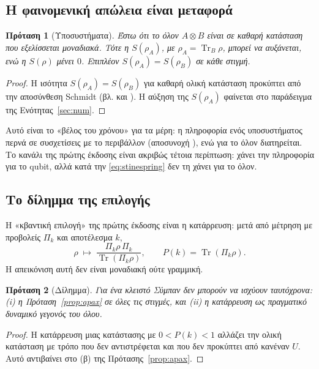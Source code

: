 \documentclass[a4paper,11pt]{article}
\newtheorem{prop}{Πρόταση}
\theoremstyle{definition}
\newcommand{\Tr}{\operatorname{Tr}}
\begin{document}
\subsection{Η φαινομενική απώλεια είναι μεταφορά}

\begin{prop}[Υποσυστήματα]\label{prop:sub}
Έστω ότι το όλον $A\otimes B$ είναι σε καθαρή κατάσταση που εξελίσσεται μοναδιακά. Τότε η $S(\rho_A)$, με $\rho_A=\Tr_B\rho$, μπορεί να αυξάνεται, ενώ η $S(\rho)$ μένει $0$. Επιπλέον $S(\rho_A)=S(\rho_B)$ σε κάθε στιγμή.
\end{prop}
\begin{proof}
Η ισότητα $S(\rho_A)=S(\rho_B)$ για καθαρή ολική κατάσταση προκύπτει από την αποσύνθεση Schmidt (βλ. και \cite{arakilieb}). Η αύξηση της $S(\rho_A)$ φαίνεται στο παράδειγμα της Ενότητας~\ref{sec:num}.
\end{proof}

Αυτό είναι το «βέλος του χρόνου» για τα μέρη: η πληροφορία ενός υποσυστήματος περνά σε συσχετίσεις με το περιβάλλον (αποσυνοχή \cite{zurek}), ενώ για το όλον διατηρείται. Το κανάλι της πρώτης έκδοσης είναι ακριβώς τέτοια περίπτωση: χάνει την πληροφορία για το qubit, αλλά κατά την \eqref{eq:stinespring} δεν τη χάνει για το όλον.

\subsection{Το δίλημμα της επιλογής}\label{sec:choice}

Η «κβαντική επιλογή» της πρώτης έκδοσης είναι η κατάρρευση: μετά από μέτρηση με προβολείς $\Pi_k$ και αποτέλεσμα $k$,
\begin{equation}
\rho\;\mapsto\;\frac{\Pi_k\rho\,\Pi_k}{\Tr(\Pi_k\rho)},\qquad P(k)=\Tr(\Pi_k\rho).
\end{equation}
Η απεικόνιση αυτή δεν είναι μοναδιακή ούτε γραμμική.

\begin{prop}[Δίλημμα]\label{prop:dilemma}
Για ένα κλειστό Σύμπαν δεν μπορούν να ισχύουν ταυτόχρονα: (i) η Πρόταση~\ref{prop:apax} σε όλες τις στιγμές, και (ii) η κατάρρευση ως πραγματικό δυναμικό γεγονός του όλου.
\end{prop}
\begin{proof}
Η κατάρρευση μιας κατάστασης με $0<P(k)<1$ αλλάζει την ολική κατάσταση με τρόπο που δεν αντιστρέφεται και που δεν προκύπτει από κανέναν $U$. Αυτό αντιβαίνει στο (β) της Πρότασης~\ref{prop:apax}.
\end{proof}
\end{document}
